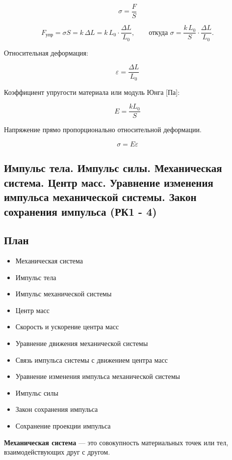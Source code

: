 \documentclass[a4paper,12pt]{article}
\begin{document}
\[
\sigma = \frac{F}{S}
\]

\[
F_{\text{упр}} = \sigma S = k\,\Delta L = k\,L_0 \cdot \frac{\Delta L}{L_0},
\qquad
\text{откуда }
\sigma
=
\frac{k\,L_0}{S}\cdot\frac{\Delta L}{L_0}.
\]

Относительная деформация:

\[
\varepsilon = \frac{\Delta L}{L_0}
\]

Коэффициент упругости материала или модуль Юнга [Па]:

\[
E = \frac{k L_0}{S}
\]

\begin{theorembox}
Напряжение прямо пропорционально относительной деформации.
\end{theorembox}

\[
\sigma = E \varepsilon
\]

\subsection{Импульс тела. Импульс силы. Механическая система. Центр масс. Уравнение изменения импульса механической системы. Закон сохранения импульса (РК1 - 4)}

\subsection*{План}
\begin{itemize}
\item Механическая система
\item Импульс тела
\item Импульс механической системы
\item Центр масс
\item Скорость и ускорение центра масс
\item Уравнение движения механической системы
\item Связь импульса системы с движением центра масс
\item Уравнение изменения импульса механической системы
\item Импульс силы
\item Закон сохранения импульса
\item Сохранение проекции импульса
\end{itemize}

\vspace{0.8em}

\begin{definitionbox}
\textbf{Механическая система} — это совокупность материальных точек или тел, взаимодействующих друг с другом.
\end{definitionbox}
\end{document}
